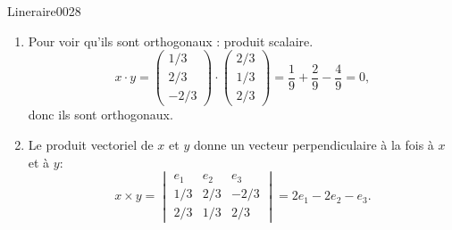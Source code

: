 \begin{corrige}{Lineraire0028}

	\begin{enumerate}

		\item
			

			Pour voir qu'ils sont orthogonaux : produit scalaire.
			\begin{equation}	
				x\cdot y=\begin{pmatrix}
					1/3	\\ 
					2/3	\\ 
					-2/3	
				\end{pmatrix}\cdot 
				\begin{pmatrix}
					2/3	\\ 
					1/3	\\ 
					2/3	
				\end{pmatrix}=
				\frac{1}{ 9 }+\frac{ 2 }{ 9 }-\frac{ 4 }{ 9 }=0,
			\end{equation}
			donc ils sont orthogonaux.

		\item
			Le produit vectoriel de $x$ et $y$ donne un vecteur perpendiculaire à la fois à $x$ et à $y$:
			\begin{equation}
				x\times y=\begin{vmatrix}
					e_1	&	e_2	&	e_3	\\
					1/3	&	2/3	&	-2/3	\\
					2/3	&	1/3	&	2/3
				\end{vmatrix}=
				2e_1-2e_2-e_3.
			\end{equation}
	\end{enumerate}

\end{corrige}
